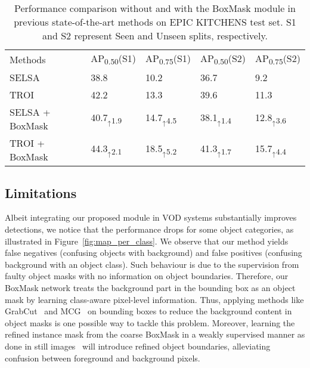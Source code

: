\documentclass[10pt,twocolumn,letterpaper]{article}
\begin{document}
\begin{table}
  \begin{center}
    {\footnotesize{
        \begin{tabular}{lll|ll}
        \toprule
        Methods & AP\textsubscript{0.50}(S1) & AP\textsubscript{0.75}(S1) &AP\textsubscript{0.50}(S2) & AP\textsubscript{0.75}(S2) \\
        \noalign{\smallskip}
        \hline
        \noalign{\smallskip}
        SELSA~\cite{wu2019sequence}  & 38.8  & 10.2 & 36.7 & 9.2 \\
        TROI~\cite{gong2021temporal}  & 42.2 & 13.3 & 39.6 & 11.3 \\
        \hline
        SELSA + BoxMask & 40.7$_{\uparrow}$\textsubscript{1.9} & 14.7$_{\uparrow}$\textsubscript{4.5} & 38.1$_{\uparrow}$\textsubscript{1.4} & 12.8$_{\uparrow}$\textsubscript{3.6} \\
        TROI + BoxMask & 44.3$_{\uparrow}$\textsubscript{2.1} & 18.5$_{\uparrow}$\textsubscript{5.2}& 41.3$_{\uparrow}$\textsubscript{1.7} & 15.7$_{\uparrow}$\textsubscript{4.4} \\
        \bottomrule
        \end{tabular}
        }}
    \end{center}
    \caption{Performance comparison without and with the BoxMask module in previous state-of-the-art methods on EPIC KITCHENS test set. S1 and S2 represent Seen and Unseen splits, respectively.}
\label{table:epic_kitchen_result}
\vspace{-10pt}
\end{table}


\subsection{Limitations}
Albeit integrating our proposed module in VOD systems substantially improves detections, we notice that the performance drops for some object categories, as illustrated in Figure~\ref{fig:map_per_class}\color{red}{(b)}\color{black}. We observe that our method yields false negatives (confusing objects with background) and false positives (confusing background with an object class). Such behaviour is due to the supervision from faulty object masks with no information on object boundaries. Therefore, our BoxMask network treats the background part in the bounding box as an object mask by learning class-aware pixel-level information. Thus, applying methods like GrabCut~\cite{rother2004grabcut} and MCG~\cite{arbelaez2014multiscale} on bounding boxes to reduce the background content in object masks is one possible way to tackle this problem. Moreover, learning the refined instance mask from the coarse BoxMask in a weakly supervised manner as done in still images~\cite{lan2021discobox, tian2021boxinst} will introduce refined object boundaries, alleviating confusion between foreground and background pixels.
\end{document}
